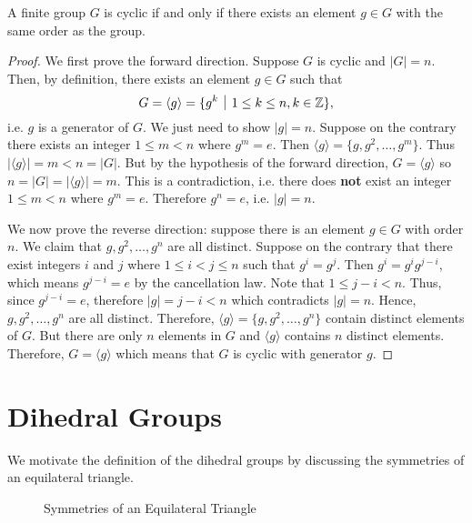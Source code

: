 \begin{theorem}\label{thrm-cyclic-group-has-element-with-same-order}
    A finite group $G$ is cyclic if and only if there exists an element $g \in G$ with the same order as the group.
\end{theorem}
\begin{proof}
    We first prove the forward direction. Suppose $G$ is cyclic and $|G| = n$. Then, by definition, there exists an element $g \in G$ such that
    \[
        G = \langle g \rangle = \{g^k \vert 1 \leq k \leq n, k \in \Z\},
    \]
    i.e. $g$ is a generator of $G$. We just need to show $|g| = n$. Suppose on the contrary there exists an integer $1 \leq m < n$ where $g^m = e$. Then $\langle g \rangle = \{g, g^2, \dots, g^m\}$. Thus $|\langle g \rangle| = m < n = |G|$. But by the hypothesis of the forward direction, $G = \langle g \rangle$ so $n = |G| = |\langle g \rangle| = m$. This is a contradiction, i.e. there does \textbf{not} exist an integer $1 \leq m < n$ where $g^m = e$. Therefore $g^n = e$, i.e. $|g| = n$.

    We now prove the reverse direction: suppose there is an element $g \in G$ with order $n$. We claim that $g, g^2, \dots, g^n$ are all distinct. Suppose on the contrary that there exist integers $i$ and $j$ where $1 \leq i < j \leq n$ such that $g^i = g^j$. Then $g^i = g^ig^{j-i}$, which means $g^{j-i} = e$ by the cancellation law. Note that $1 \leq j - i < n$. Thus, since $g^{j-i} = e$, therefore $|g| = j - i < n$ which contradicts $|g| = n$. Hence, $g, g^2, \dots, g^n$ are all distinct. Therefore, $\langle g \rangle = \{g, g^2, \dots, g^n\}$ contain distinct elements of $G$. But there are only $n$ elements in $G$ and $\langle g \rangle$ contains $n$ distinct elements. Therefore, $G = \langle g \rangle$ which means that $G$ is cyclic with generator $g$.
\end{proof}

\section{Dihedral Groups}
We motivate the definition of the dihedral groups by discussing the symmetries of an equilateral triangle.

\begin{figure}[h]
    \centering
    \caption{Symmetries of an Equilateral Triangle}
\end{figure}


